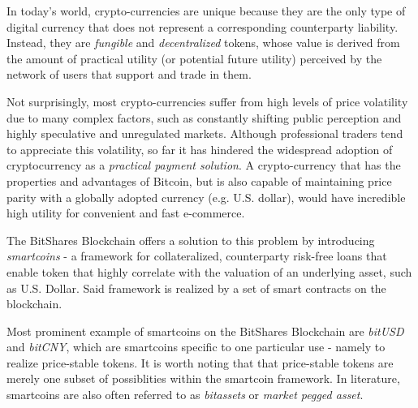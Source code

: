 \label{sec:mpa}
In today's world, crypto-currencies are unique because they are the only type
of digital currency that does not represent a corresponding counterparty
liability. Instead, they are \emph{fungible} and \emph{decentralized} tokens, whose
value is derived from the amount of practical utility (or potential future
utility) perceived by the network of users that support and trade in them.

Not surprisingly, most crypto-currencies suffer from high levels of price
volatility due to many complex factors, such as constantly shifting
public perception and highly speculative and unregulated markets.
Although professional traders tend to appreciate this volatility, so far
it has hindered the widespread adoption of cryptocurrency as a
\emph{practical payment solution}. A crypto-currency that has the
properties and advantages of Bitcoin, but is also capable of maintaining
price parity with a globally adopted currency (e.g. U.S. dollar), would
have incredible high utility for convenient and fast e-commerce.

The BitShares Blockchain offers a solution to this problem by introducing
\emph{smartcoins} - a framework for collateralized, counterparty risk-free loans
that enable token that highly correlate with the valuation of an
underlying asset, such as U.S. Dollar. Said framework is realized by a set of smart contracts
on the blockchain. 

Most prominent example of smartcoins on the BitShares Blockchain are 
\emph{bitUSD} and \emph{bitCNY}, which are smartcoins specific to one particular use
- namely to realize price-stable tokens. It is worth noting that that
price-stable tokens are merely one subset of possiblities within the
smartcoin framework. In literature, smartcoins are also often referred
to as \emph{bitassets} or \emph{market pegged asset}.